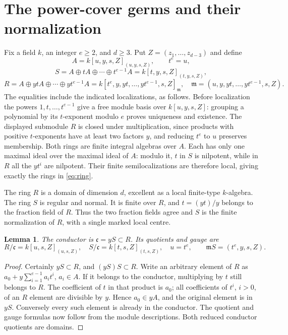 \documentclass[11pt]{article}
\newtheorem{lemma}[theorem]{Lemma}
\newcommand{\m}{\mathfrak m}
\begin{document}
\section{The power-cover germs and their normalization}
Fix a field $k$, an integer $e\ge2$, and $d\ge3$. Put
$Z=(z_1,\ldots,z_{d-3})$ and define
\[
 A=k[u,y,s,Z]_{(u,y,s,Z)},\qquad t^e=u,
\]
\[
 S=A\oplus tA\oplus\cdots\oplus t^{e-1}A
   =k[t,y,s,Z]_{(t,y,s,Z)},
\]
\begin{equation}\label{eq:ring}
 R=A\oplus ytA\oplus\cdots\oplus yt^{e-1}A
   =k[t^e,y,yt,\ldots,yt^{e-1},s,Z]_{\m},
 \quad \m=(u,y,yt,\ldots,yt^{e-1},s,Z).
\end{equation}
The equalities include the indicated localizations, as follows.
Before localization the powers $1,t,\ldots,t^{e-1}$ give a free
module basis over $k[u,y,s,Z]$: grouping a polynomial by its
$t$-exponent modulo $e$ proves uniqueness and existence.
The displayed submodule $R$ is closed under multiplication, since
products with positive $t$-exponents have at least two factors $y$,
and reducing $t^e$ to $u$ preserves membership.
Both rings are finite integral algebras over $A$. Each has only one
maximal ideal over the maximal ideal of $A$: modulo it, $t$ in $S$
is nilpotent, while in $R$ all the $yt^i$ are nilpotent.
Their finite semilocalizations are therefore local, giving exactly
the rings in \eqref{eq:ring}.

The ring $R$ is a domain of dimension $d$, excellent as a local
finite-type $k$-algebra. The ring $S$ is regular and normal.
It is finite over $R$, and $t=(yt)/y$ belongs to the fraction field
of $R$. Thus the two fraction fields agree and $S$ is the finite
normalization of $R$, with a single marked local centre.

\begin{lemma}\label{lem:conductor}
The conductor is $\mathfrak c=yS\subset R$. Its quotients and gauge are
\[
 R/\mathfrak c=k[u,s,Z]_{(u,s,Z)},\quad
 S/\mathfrak c=k[t,s,Z]_{(t,s,Z)},\quad u=t^e,
 \qquad \m S=(t^e,y,s,Z).
\]
\end{lemma}
\begin{proof}
Certainly $yS\subset R$, and $(yS)S\subset R$.
Write an arbitrary element of $R$ as
$a_0+y\sum_{i=1}^{e-1}a_it^i$, $a_i\in A$.
If it belongs to the conductor, multiplying by $t$ still belongs
to $R$. The coefficient of $t$ in that product is $a_0$;
all coefficients of $t^i$, $i>0$, of an $R$ element are divisible
by $y$. Hence $a_0\in yA$, and the original element is in $yS$.
Conversely every such element is already in the conductor.
The quotient and gauge formulas now follow from the module descriptions.
Both reduced conductor quotients are domains.
\end{proof}
\end{document}
